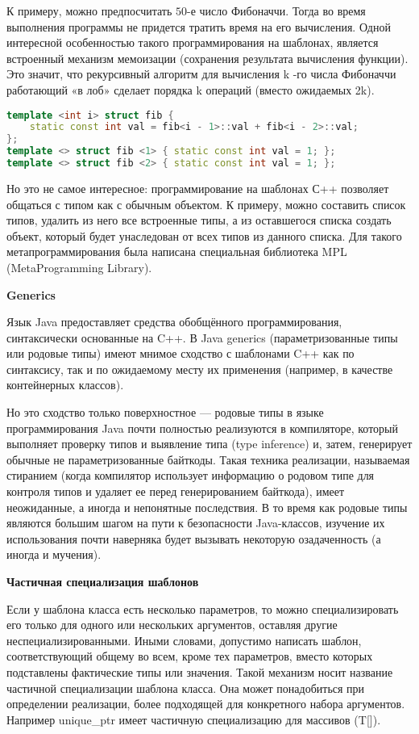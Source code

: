 \documentclass{article}
\begin{document}
К примеру, можно предпосчитать $50$-е число Фибоначчи. Тогда во время выполнения программы не придется тратить время на его вычисления. Одной интересной особенностью такого программирования на шаблонах, является встроенный механизм мемоизации (сохранения результата вычисления функции). Это значит, что рекурсивный алгоритм для вычисления k -го числа Фибоначчи работающий «в лоб» сделает порядка k операций (вместо ожидаемых 2k).

\begin{lstlisting}[language=C++]
template <int i> struct fib { 
	static const int val = fib<i - 1>::val + fib<i - 2>::val;
};
template <> struct fib <1> { static const int val = 1; };
template <> struct fib <2> { static const int val = 1; };
\end{lstlisting}

Но это не самое интересное: программирование на шаблонах С++ позволяет общаться с типом как с обычным объектом. К примеру, можно составить список типов, удалить из него все встроенные типы, а
из оставшегося списка создать объект, который будет унаследован от всех типов из данного списка. Для такого метапрограммирования была написана специальная библиотека MPL (MetaProgramming Library).

\textbf{Generics}

Язык Java предоставляет средства обобщённого программирования, синтаксически основанные на C++. В Java generics (параметризованные типы или родовые типы) имеют мнимое сходство с шаблонами C++ как
по синтаксису, так и по ожидаемому месту их применения (например, в качестве контейнерных классов).

Но это сходство только поверхностное — родовые типы в языке программирования Java почти полностью реализуются в компиляторе, который выполняет проверку типов и выявление типа (type inference)
и, затем, генерирует обычные не параметризованные байткоды. Такая техника реализации, называемая стиранием (когда компилятор использует информацию о родовом типе для контроля типов и удаляет ее перед генерированием байткода), имеет неожиданные, а иногда и непонятные последствия. В то время как родовые типы являются большим шагом на пути к безопасности Java-классов, изучение их использования почти наверняка будет вызывать некоторую озадаченность (а иногда и мучения).

\textbf{Частичная специализация шаблонов}

Если у шаблона класса есть несколько параметров, то можно специализировать его только для одного или нескольких аргументов, оставляя другие неспециализированными. Иными словами, допустимо написать шаблон, соответствующий общему во всем, кроме тех параметров, вместо которых подставлены фактические типы или значения. Такой механизм носит название частичной специализации шаблона класса. Она может понадобиться при определении реализации, более подходящей для конкретного набора аргументов. Например unique\_ptr имеет частичную специализацию для массивов (T[]).
\end{document}
